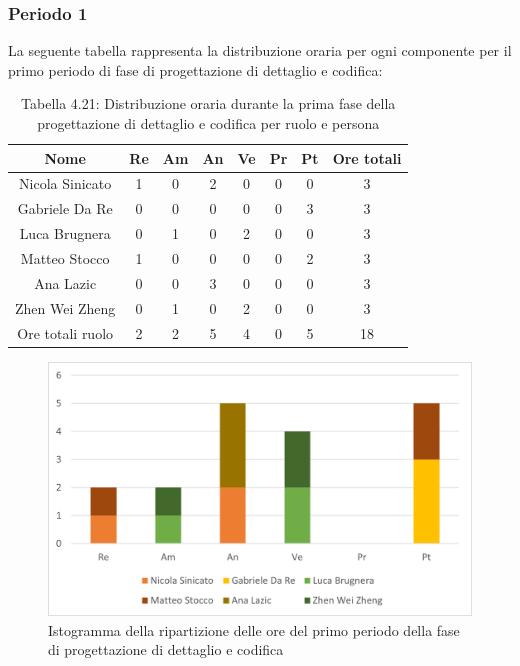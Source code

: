 \subsubsection{Periodo 1}
%
La seguente tabella rappresenta la distribuzione oraria per ogni componente per il primo periodo di fase di progettazione di dettaglio e codifica:
\begin{table}[h]
	\setlength\extrarowheight{5pt}
	\centering
	\begin{tabularx}{\textwidth}{|ccccccc|c|}
		\hline
		\rowcolor{white}
		\textbf{Nome} & \textbf{Re} & \textbf{Am} & \textbf{An} & \textbf{Ve} & \textbf{Pr}& \textbf{Pt} & \textbf{Ore totali} \\
		\hline
		Nicola Sinicato &1&0&2&0&0&0&3 \\
		Gabriele Da Re &0&0&0&0&0&3&3 \\
		Luca Brugnera &0&1&0&2&0&0&3 \\
		Matteo Stocco &1&0&0&0&0&2&3 \\
		Ana Lazic &0&0&3&0&0&0&3 \\
		Zhen Wei Zheng &0&1&0&2&0&0&3 \\
		\hline
		Ore totali ruolo &2&2&5&4&0&5&18 \\
		\hline
	\end{tabularx}
	\vspace{10pt}
	\caption{Tabella 4.21: Distribuzione oraria durante la prima fase della progettazione di dettaglio e codifica per ruolo e persona}
\end{table}
\begin{figure}[H]
    \centering
    \includegraphics[scale=0.6]{img/grafi preventivo/istogrammi/codifica/periodo1.png}
    \caption{Istogramma della ripartizione delle ore del primo periodo della fase di progettazione di dettaglio e codifica}
\end{figure}
